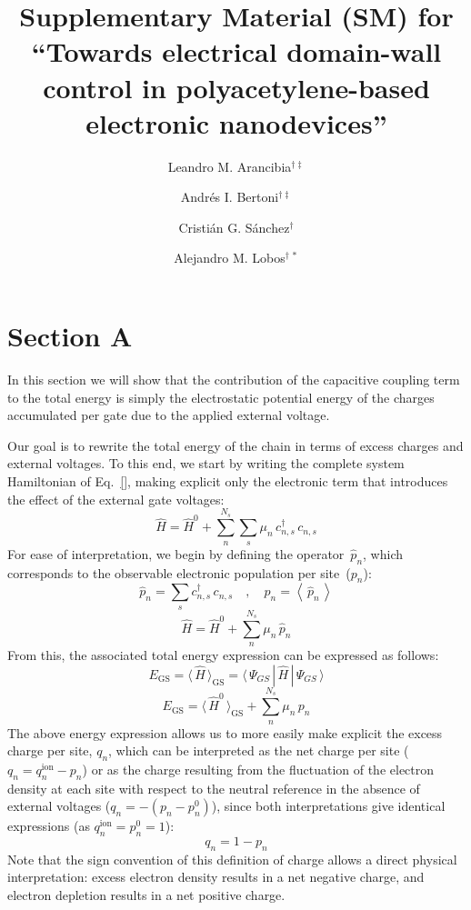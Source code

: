 \documentclass[aps, prd, reprint]{revtex4-2}
\begin{document}
\title{Supplementary Material (SM) for\\``Towards electrical domain-wall control in polyacetylene-based electronic nanodevices''}

\author{Leandro M. Arancibia$^{\dagger\ddagger}$}
\author{Andrés I. Bertoni$^{\dagger\ddagger}$}
\author{Cristián G. Sánchez$^{\dagger}$}
\author{Alejandro M. Lobos$^{\dagger\,*}$}

\maketitle

\section*{Section A}

In this section we will show that the contribution of the capacitive coupling term to the total energy is simply the electrostatic potential energy of the charges accumulated per gate due to the applied external voltage.

Our goal is to rewrite the total energy of the chain in terms of excess charges and external voltages. To this end, we start by writing the complete system Hamiltonian of Eq.~\ref{}, making explicit only the electronic term that introduces the effect of the external gate voltages:
\[
\hat{H} = \hat{H}^{0} + \sum_{n}^{N_{s}}\sum_{s} \mu_{n} \, c_{n,s}^{\dagger} \, c_{n,s}
\]
For ease of interpretation, we begin by defining the operator~$\hat{p}_{n}$, which corresponds to the observable electronic population per site~($p_{n}$):
\[
\hat{p}_{n} = \sum_{s} c_{n,s}^{\dagger} \, c_{n,s} \quad , \quad p_{n} = \left\langle \, \hat{p}_{n} \, \right\rangle
\]\[
\hat{H} = \hat{H}^{0} + \sum_{n}^{N_{s}} \mu_{n} \, \hat{p}_{n}
\]
From this, the associated total energy expression can be expressed as follows:
\[
E_{\mathrm{GS}} = \langle\, \hat{H} \,\rangle_{\mathrm{GS}} = \langle \, \Psi_{GS} \, | \, \hat{H} \, | \, \Psi_{GS} \, \rangle
\]\[
E_{\mathrm{GS}} = \langle\, \hat{H}^{0} \,\rangle_{\mathrm{GS}} + \sum_{n}^{N_{s}} \mu_{n} \, p_{n}
\]
The above energy expression allows us to more easily make explicit the excess charge per site, $q_{n}$, which can be interpreted as the net charge per site (${q_{n} = q^{\text{ion}}_{n} - p_{n}}$) or as the charge resulting from the fluctuation of the electron density at each site with respect to the neutral reference in the absence of external voltages (${q_{n} = -(p_{n} - p_{n}^{0})}$), since both interpretations give identical expressions (as ${q^{\text{ion}}_{n} = p_{n}^{0} = 1}$):
\[
q_{n} = 1 - p_{n}
\]
Note that the sign convention of this definition of charge allows a direct physical interpretation: excess electron density results in a net negative charge, and electron depletion results in a net positive charge.
\end{document}
